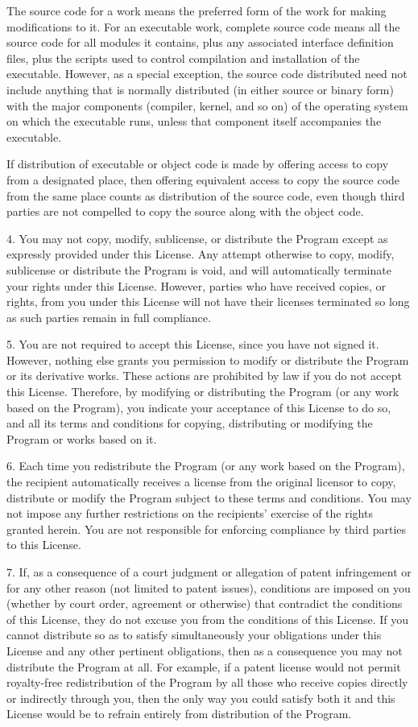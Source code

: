 \documentclass[a4paper, 11pt, twoside]{article}
\begin{document}
The source code for a work means the preferred form of the work for making modifications to it. For an executable work, complete source code means all the source code for all modules it contains, plus any associated interface definition files, plus the scripts used to control compilation and installation of the executable. However, as a special exception, the source code distributed need not include anything that is normally distributed (in either source or binary form) with the major components (compiler, kernel, and so on) of the operating system on which the executable runs, unless that component itself accompanies the executable.

If distribution of executable or object code is made by offering access to copy from a designated place, then offering equivalent access to copy the source code from the same place counts as distribution of the source code, even though third parties are not compelled to copy the source along with the object code.

4. You may not copy, modify, sublicense, or distribute the Program except as expressly provided under this License. Any attempt otherwise to copy, modify, sublicense or distribute the Program is void, and will automatically terminate your rights under this License. However, parties who have received copies, or rights, from you under this License will not have their licenses terminated so long as such parties remain in full compliance.

5. You are not required to accept this License, since you have not signed it. However, nothing else grants you permission to modify or distribute the Program or its derivative works. These actions are prohibited by law if you do not accept this License. Therefore, by modifying or distributing the Program (or any work based on the Program), you indicate your acceptance of this License to do so, and all its terms and conditions for copying, distributing or modifying the Program or works based on it.

6. Each time you redistribute the Program (or any work based on the Program), the recipient automatically receives a license from the original licensor to copy, distribute or modify the Program subject to these terms and conditions. You may not impose any further restrictions on the recipients' exercise of the rights granted herein. You are not responsible for enforcing compliance by third parties to this License.

7. If, as a consequence of a court judgment or allegation of patent infringement or for any other reason (not limited to patent issues), conditions are imposed on you (whether by court order, agreement or otherwise) that contradict the conditions of this License, they do not excuse you from the conditions of this License. If you cannot distribute so as to satisfy simultaneously your obligations under this License and any other pertinent obligations, then as a consequence you may not distribute the Program at all. For example, if a patent license would not permit royalty-free redistribution of the Program by all those who receive copies directly or indirectly through you, then the only way you could satisfy both it and this License would be to refrain entirely from distribution of the Program.
\end{document}
